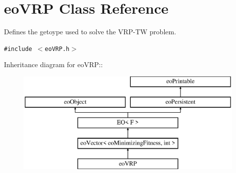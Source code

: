 \section{eo\-VRP Class Reference}
\label{classeo_v_r_p}
Defines the getoype used to solve the VRP-TW problem.  


{\tt \#include $<$eo\-VRP.h$>$}

Inheritance diagram for eo\-VRP::\begin{figure}[H]
\begin{center}
\leavevmode
\includegraphics[height=5cm]{classeo_v_r_p}
\end{center}
\end{figure}
